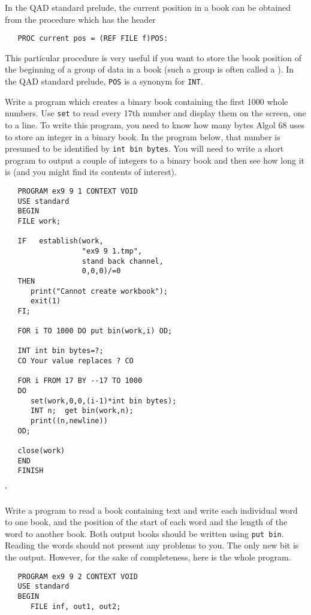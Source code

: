 In the QAD standard prelude, the current position in a book can be
obtained from the procedure  which has the header
\begin{verbatim}
   PROC current pos = (REF FILE f)POS:
\end{verbatim}
\noindent
This particular procedure is very useful if you want to store the
book position of the beginning of a group of data in a book (such a
group is often called a ). In the QAD
standard prelude, \verb|POS| is a synonym for \verb|INT|.

\begin{exercise}
\item Write a program which creates a binary book containing the
first 1000 whole numbers. Use \verb|set| to read every 17th number
and display them on the screen, one to a line. \ans To write this
program, you need to know how many bytes Algol 68 uses to store an
integer in a binary book. In the program below, that number is
presumed to be identified by \verb|int bin bytes|. You will need to
write a short program to output a couple of integers to a binary book
and then see how long it is (and you might find its contents of
interest).
\begin{verbatim}
   PROGRAM ex9 9 1 CONTEXT VOID
   USE standard
   BEGIN
   FILE work;

   IF   establish(work,
                  "ex9 9 1.tmp",
                  stand back channel,
                  0,0,0)/=0
   THEN
      print("Cannot create workbook");
      exit(1)
   FI;

   FOR i TO 1000 DO put bin(work,i) OD;

   INT int bin bytes=?;
   CO Your value replaces ? CO

   FOR i FROM 17 BY --17 TO 1000
   DO
      set(work,0,0,(i-1)*int bin bytes);
      INT n;  get bin(work,n);
      print((n,newline))
   OD;

   close(work)
   END
   FINISH
\end{verbatim}
'
\item Write a program to read a book containing text and write each
individual word to one book, and the position of the start of each
word and the length of the word to another book. Both output books
should be written using \verb|put bin|. \ans Reading the words should
not present any problems to you. The only new bit is the output.
However, for the sake of completeness, here is the whole program.
\begin{verbatim}
   PROGRAM ex9 9 2 CONTEXT VOID
   USE standard
   BEGIN
      FILE inf, out1, out2;


\end{verbatim}
\end{exercise}
